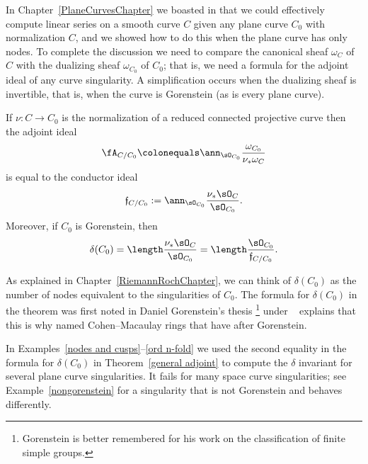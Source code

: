 In Chapter~\ref{PlaneCurvesChapter} we boasted in that we could
effectively compute
linear series on a smooth curve $C$ given any plane curve $C_0$ with
normalization $C$,
and we showed how to do this when the plane curve has only nodes. To
complete the discussion
we need to compare the canonical sheaf $\omega_{C}$ of $C$ with
the dualizing sheaf $\omega_{C_{0}}$ of $C_0$; 
that is, we need a formula for the adjoint ideal of any
curve singularity. A simplification occurs when the dualizing sheaf is
invertible, that is, when the curve is Gorenstein (as is every plane curve).

\begin{theorem}\label{general adjoint}
If $\nu: C \to C_0$ is the normalization of a reduced connected projective
curve then the
adjoint ideal
$$
\fA_{C/C_0} \colonequals \ann_{\sO_{C_0}}\frac{\omega_{C_0}}{\nu_*
\omega_C}
$$
is equal to the conductor ideal
$$
\mathfrak f_{C/C_0}: = \ann_{\sO_{C_0}}\frac{\nu_* \sO_C}{\sO_{C_0}}
.
$$
Moreover, if $C_0$ is Gorenstein, then
$$
\delta(C_0) = \length \frac{\nu_* \sO_C}{\sO_{C_0}} = \length \frac
{\sO_{C_0}}{\mathfrak f_{C/C_0}}.
$$
\end{theorem}

As explained in Chapter~\ref{RiemannRochChapter},
we can think of
$\delta(C_0)$ as the number of nodes equivalent to the
singularities of $C_0$. 	
The formula for $\delta(C_0)$ in 
the theorem was first noted in Daniel Gorenstein's thesis
\footnote{Gorenstein is better remembered for his
work on the classification of finite simple groups.} 
%
%
under 
%
\ 
%
\citeyear{Bass}
explains that this is why
%
named Cohen--Macaulay rings that have
%
%
after Gorenstein.

In Examples~\ref{nodes and cusps}--\ref{ord n-fold} we used the second equality in the formula for $\delta(C_{0})$ in Theorem~\ref{general adjoint} to compute the $\delta$ invariant for
several plane curve singularities. It fails for many space curve singularities; see
Example~\ref{nongorenstein} for a singularity that is not Gorenstein
and behaves differently.

